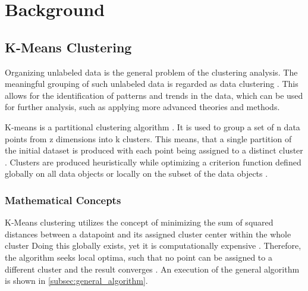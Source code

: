 \chapter{Background}
\label{cha:background}






%

\section{K-Means Clustering}
\label{sec:k_means_clustering}
Organizing unlabeled data \cite{EZU-CPF} is the general problem of the clustering analysis.
The meaningful grouping of such unlabeled data is regarded as data clustering \cite{ABI-RKC}.
This allows for the identification of patterns and trends in the data, which can be used for further analysis, such as applying more advanced theories and methods.

K-means is a partitional clustering algorithm \cite{SIN-UKC}.
It is used to group a set of n data points from z dimensions into k clusters.
This means, that a single partition of the initial dataset is produced with each point being assigned to a distinct cluster \cite{SIN-UKC}.
Clusters are produced heuristically while optimizing a criterion function defined globally on all data objects or locally on the subset of the data objects \cite{ZHU-EPC}.

\subsection{Mathematical Concepts}
K-Means clustering utilizes the concept of minimizing the sum of squared distances between a datapoint and its assigned cluster center within the whole cluster \cite{HAR-KMA}
Doing this globally exists, yet it is computationally expensive \cite{LIS-GKC}.
Therefore, the algorithm seeks local optima, such that no point can be assigned to a different cluster and the result converges \cite{SEL-GCT}.
An execution of the general algorithm is shown in \autoref{subsec:general_algorithm}.

